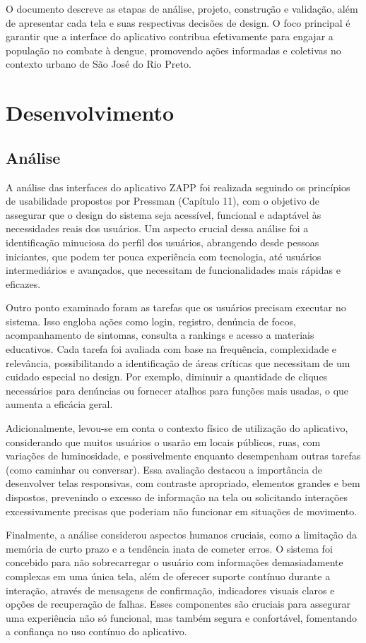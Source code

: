 \documentclass[a5paper, 12pt]{article}
\begin{document}
O documento descreve as etapas de análise, projeto, construção e validação, além de apresentar cada tela e suas respectivas decisões de design. O foco principal é garantir que a interface do aplicativo contribua efetivamente para engajar a população no combate à dengue, promovendo ações informadas e coletivas no contexto urbano de São José do Rio Preto.

\newpage
\section{Desenvolvimento}

\subsection{Análise}
A análise das interfaces do aplicativo ZAPP foi realizada seguindo os princípios de usabilidade propostos por Pressman (Capítulo 11), com o objetivo de assegurar que o design do sistema seja acessível, funcional e adaptável às necessidades reais dos usuários. Um aspecto crucial dessa análise foi a identificação minuciosa do perfil dos usuários, abrangendo desde pessoas iniciantes, que podem ter pouca experiência com tecnologia, até usuários intermediários e avançados, que necessitam de funcionalidades mais rápidas e eficazes.

Outro ponto examinado foram as tarefas que os usuários precisam executar no sistema. Isso engloba ações como login, registro, denúncia de focos, acompanhamento de sintomas, consulta a rankings e acesso a materiais educativos. Cada tarefa foi avaliada com base na frequência, complexidade e relevância, possibilitando a identificação de áreas críticas que necessitam de um cuidado especial no design. Por exemplo, diminuir a quantidade de cliques necessários para denúncias ou fornecer atalhos para funções mais usadas, o que aumenta a eficácia geral.

Adicionalmente, levou-se em conta o contexto físico de utilização do aplicativo, considerando que muitos usuários o usarão em locais públicos, ruas, com variações de luminosidade, e possivelmente enquanto desempenham outras tarefas (como caminhar ou conversar). Essa avaliação destacou a importância de desenvolver telas responsivas, com contraste apropriado, elementos grandes e bem dispostos, prevenindo o excesso de informação na tela ou solicitando interações excessivamente precisas que poderiam não funcionar em situações de movimento.

Finalmente, a análise considerou aspectos humanos cruciais, como a limitação da memória de curto prazo e a tendência inata de cometer erros. O sistema foi concebido para não sobrecarregar o usuário com informações demasiadamente complexas em uma única tela, além de oferecer suporte contínuo durante a interação, através de mensagens de confirmação, indicadores visuais claros e opções de recuperação de falhas. Esses componentes são cruciais para assegurar uma experiência não só funcional, mas também segura e confortável, fomentando a confiança no uso contínuo do aplicativo.
\end{document}
